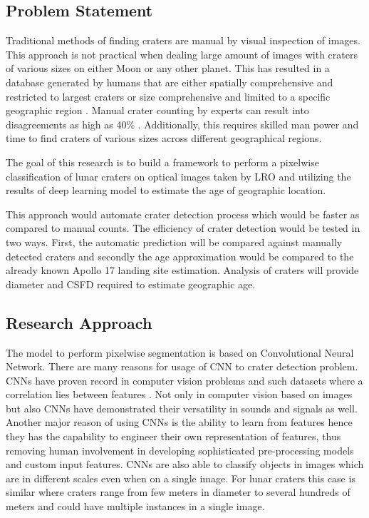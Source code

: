 \documentclass[11pt]{article}
\begin{document}
\subsection{Problem Statement}
Traditional methods of finding craters are manual by visual inspection of images. This approach is not practical when dealing large amount of images with craters of various sizes on either Moon or any other planet. This has resulted in a database generated by humans that are either spatially comprehensive and restricted to largest craters or size comprehensive and limited to a specific geographic region \cite{stepinski2012detecting}. Manual crater counting by experts can result into disagreements as high as 40\% \cite{greeley1970precision}. Additionally, this requires skilled man power and time to find craters of various sizes across different geographical regions.

The goal of this research is to build a framework to perform a pixelwise classification of lunar craters on optical images taken by LRO and utilizing the results of deep learning model to estimate the age of geographic location.

This approach would automate crater detection process which would be faster as compared to manual counts. The efficiency of crater detection would be tested in two ways. First, the automatic prediction will be compared against manually detected craters and secondly the age approximation would be compared to the already known Apollo 17 landing site estimation. Analysis of craters will provide diameter and CSFD required to estimate geographic age.

\subsection{Research Approach}
The model to perform pixelwise segmentation is based on Convolutional Neural Network. There are many reasons for usage of CNN to crater detection problem. CNNs have proven record in computer vision problems and such datasets where a correlation lies between features \cite{long2015fully}. Not only in computer vision based on images but also CNNs have demonstrated their versatility in sounds and signals as well. Another major reason of using CNNs is the ability to learn from features hence they has the capability to engineer their own representation of features, thus removing human involvement in developing sophisticated pre-processing models and custom input features. CNNs are also able to classify objects in images which are in different scales even when on a single image. For lunar craters this case is similar where craters range from few meters in diameter to several hundreds of meters and could have multiple instances in a single image.
\end{document}
